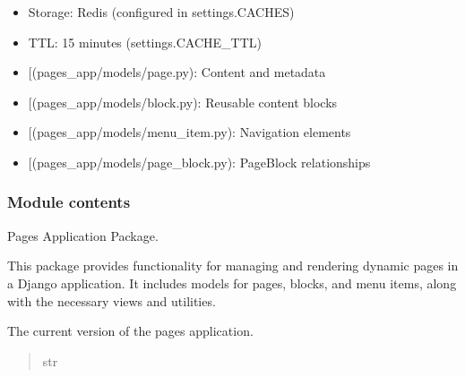 \documentclass[letterpaper,10pt,english]{sphinxmanual}
\begin{document}
\begin{fulllineitems}
\begin{description}
\begin{itemize}
\item {} 
\sphinxAtStartPar
Storage: Redis (configured in settings.CACHES)

\item {} 
\sphinxAtStartPar
TTL: 15 minutes (settings.CACHE\_TTL)

\end{itemize}

\begin{itemize}
\item {} 
\sphinxAtStartPar
{[}\sphinxtitleref{Page}{]}(pages\_app/models/page.py): Content and metadata

\item {} 
\sphinxAtStartPar
{[}\sphinxtitleref{Block}{]}(pages\_app/models/block.py): Reusable content blocks

\item {} 
\sphinxAtStartPar
{[}\sphinxtitleref{MenuItem}{]}(pages\_app/models/menu\_item.py): Navigation elements

\item {} 
\sphinxAtStartPar
{[}\sphinxtitleref{PageBlock}{]}(pages\_app/models/page\_block.py): Page\sphinxhyphen{}Block relationships

\end{itemize}

\end{description}

\end{fulllineitems}



\subsubsection{Module contents}
\label{\detokenize{pages_app:module-pages_app}}\label{\detokenize{pages_app:module-contents}}
\sphinxAtStartPar
Pages Application Package.

\sphinxAtStartPar
This package provides functionality for managing and rendering dynamic pages
in a Django application. It includes models for pages, blocks, and menu items,
along with the necessary views and utilities.

\begin{fulllineitems}
\label{\detokenize{pages_app:pages_app.__version__}}
\pysigstartsignatures
\pysigline
{}
\pysigstopsignatures
\sphinxAtStartPar
The current version of the pages application.
\begin{quote}\begin{description}
\sphinxAtStartPar
str

\end{description}\end{quote}

\end{fulllineitems}
\end{document}

